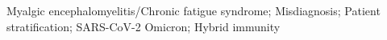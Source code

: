
\vfill

 Myalgic encephalomyelitis/Chronic fatigue syndrome; Misdiagnosis; Patient stratification; SARS-CoV-2 Omicron; Hybrid immunity
